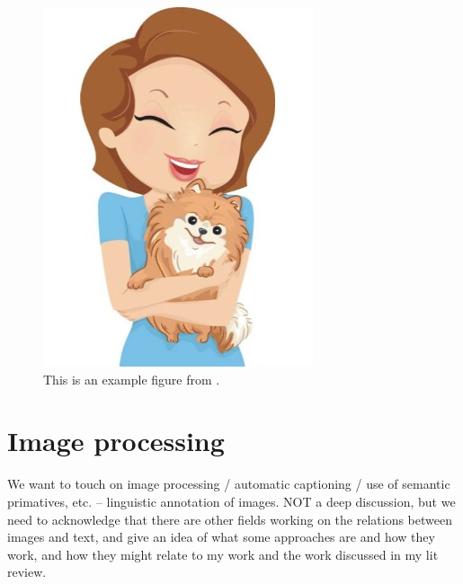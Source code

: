 \begin{figure}
\includegraphics[width=.7\textwidth]{figures/I29.jpg}
\caption{This is an example figure from \citet{king:dickinson:18}.}
\label{figure:KandD2018}
\end{figure}

\section{Image processing}
\label{figure:imageProcessing}
We want to touch on image processing / automatic captioning / use of semantic primatives, etc. -- linguistic annotation of images. NOT a deep discussion, but we need to acknowledge that there are other fields working on the relations between images and text, and give an idea of what some approaches are and how they work, and how they might relate to my work and the work discussed in my lit review.


